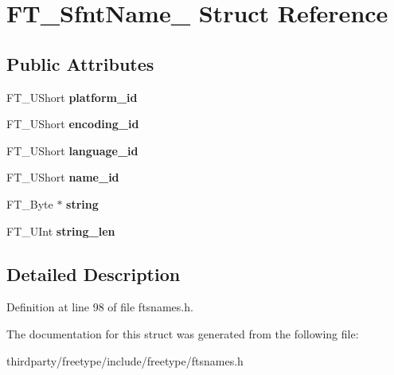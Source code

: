 \hypertarget{struct_f_t___sfnt_name__}{}\section{F\+T\+\_\+\+Sfnt\+Name\+\_\+ Struct Reference}
\label{struct_f_t___sfnt_name__}
\subsection*{Public Attributes}
\begin{DoxyCompactItemize}
\item 
\mbox{\label{struct_f_t___sfnt_name___ae92450a058eb4737df85f66226d69f43}} 
F\+T\+\_\+\+U\+Short {\bfseries platform\+\_\+id}
\item 
\mbox{\label{struct_f_t___sfnt_name___a01f4573605eab3f4d2e4b9b50b0de98f}} 
F\+T\+\_\+\+U\+Short {\bfseries encoding\+\_\+id}
\item 
\mbox{\label{struct_f_t___sfnt_name___a6fb23e0f299a97b25b63805b04cf1fc5}} 
F\+T\+\_\+\+U\+Short {\bfseries language\+\_\+id}
\item 
\mbox{\label{struct_f_t___sfnt_name___ac07be3e852408990fe0a910f00b68f4e}} 
F\+T\+\_\+\+U\+Short {\bfseries name\+\_\+id}
\item 
\mbox{\label{struct_f_t___sfnt_name___ab369e2c3d8dc9662f69c53e4d3158067}} 
F\+T\+\_\+\+Byte $\ast$ {\bfseries string}
\item 
\mbox{\label{struct_f_t___sfnt_name___a4ebdb7207b5681d16f9cc17f432cb56f}} 
F\+T\+\_\+\+U\+Int {\bfseries string\+\_\+len}
\end{DoxyCompactItemize}


\subsection{Detailed Description}


Definition at line 98 of file ftsnames.\+h.



The documentation for this struct was generated from the following file\+:\begin{DoxyCompactItemize}
\item 
thirdparty/freetype/include/freetype/ftsnames.\+h\end{DoxyCompactItemize}
